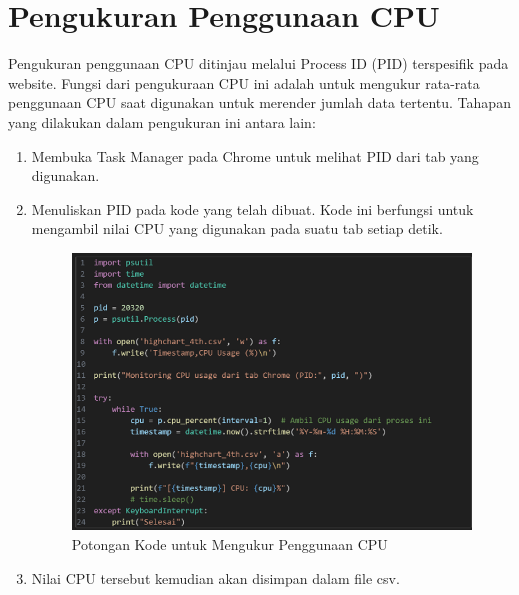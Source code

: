 \section{Pengukuran Penggunaan CPU}
Pengukuran penggunaan CPU ditinjau melalui Process ID (PID) terspesifik pada website. Fungsi dari pengukuraan CPU ini adalah untuk mengukur rata-rata penggunaan CPU saat digunakan untuk merender jumlah data tertentu. Tahapan yang dilakukan dalam pengukuran ini antara lain: 
\begin{enumerate}
	\item Membuka Task Manager pada Chrome untuk melihat PID dari tab yang digunakan. 
	\item Menuliskan PID pada kode yang telah dibuat. Kode ini berfungsi untuk mengambil nilai CPU yang digunakan pada suatu tab setiap detik. 
	 	\begin{figure}[H]
		\centering
		\includegraphics[width=0.8\linewidth]{gambar/Pembahasan/Mengukur CPU.png}
		\caption{Potongan Kode untuk Mengukur Penggunaan CPU}
		\label{Potongan Kode untuk Mengukur Penggunaan CPU}
	\end{figure}
	\item Nilai CPU tersebut kemudian akan disimpan dalam file csv.
\end{enumerate}



